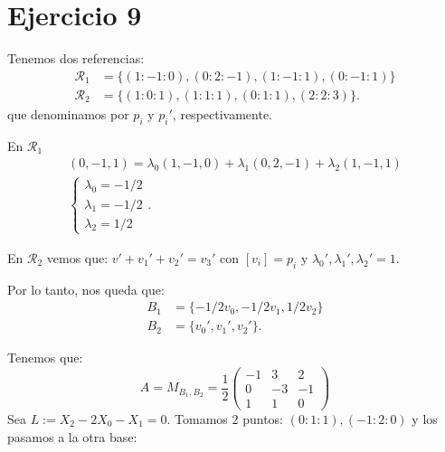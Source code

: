 \documentclass[10pt,a4paper,openright]{book}
\theoremstyle{break}
\begin{document}
\section{Ejercicio 9}%
\label{sec:ejercicio_9_3}
Tenemos dos referencias:
\begin{align*}
    \mathcal{R}_1 &= \{\left( 1 : -1 : 0 \right), \left( 0 : 2 : -1 \right), \left( 1 : -1 : 1 \right), \left( 0 : -1 : 1 \right)\} \\    
    \mathcal{R}_2 &= \{\left( 1 : 0 : 1 \right), \left( 1 : 1 : 1 \right), \left( 0 : 1 : 1 \right), \left( 2 : 2 : 3 \right)\}    
.\end{align*}
que denominamos por $p_i$ y $p_i'$, respectivamente.

En $\mathcal{R}_1$ 
\begin{gather*}
\left( 0, -1, 1 \right) = \lambda_0 \left( 1, -1, 0 \right) + \lambda_1 \left( 0, 2, -1 \right) + \lambda_2 \left( 1, -1, 1 \right)\\
\begin{cases}
    \lambda_0 = -1/2\\
    \lambda_1 = -1/2\\
    \lambda_2 = 1/2
\end{cases} 
.\end{gather*}

En $\mathcal{R}_2$ vemos que: $v' + v_1' + v_2' = v_3'$ con $\left[ v_i \right] = p_i$ y $\lambda_0', \lambda_1', \lambda_2' = 1$.

Por lo tanto, nos queda que:
\begin{align*}
    B_1 &= \{-1/2 v_0, -1/2 v_1, 1/2 v_2\}\\
    B_2 &= \{v_0', v_1', v_2'\}
.\end{align*}

Tenemos que:
\[
    A = M_{B_1, B_2} = \frac{1}{2} \begin{pmatrix} -1 & 3 & 2\\ 0 & -3 & -1\\ 1 & 1 & 0 \end{pmatrix} 
\]
Sea $L := X_2 - 2X_0 - X_1 = 0$. Tomamos $2$ puntos: $\left( 0 : 1 : 1 \right), \left( -1 : 2 : 0 \right)$ y los pasamos a la otra base:
\end{document}
